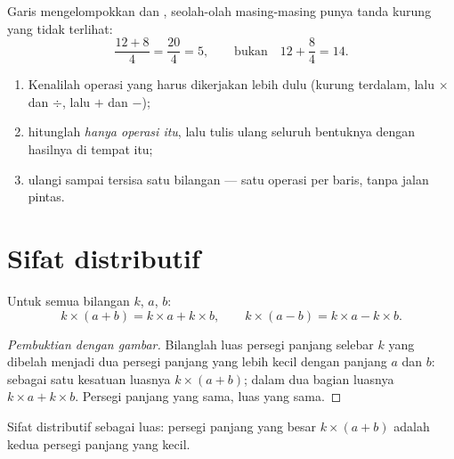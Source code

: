 \begin{remark}
Garis  mengelompokkan  dan , seolah-olah
masing-masing punya tanda kurung yang tidak terlihat:
\[
\frac{12 + 8}{4} = \frac{20}{4} = 5,
\qquad\text{bukan}\quad 12 + \frac{8}{4} = 14 .
\]
\end{remark}

\begin{method}\label{met:g7:priorities:safe}
\begin{enumerate}
  \item Kenalilah operasi yang harus dikerjakan lebih dulu (kurung
        terdalam, lalu $\times$ dan $\div$, lalu $+$ dan $-$);
  \item hitunglah \emph{hanya operasi itu}, lalu tulis ulang seluruh
        bentuknya dengan hasilnya di tempat itu;
  \item ulangi sampai tersisa satu bilangan --- satu operasi per
        baris, tanpa jalan pintas.
\end{enumerate}
\end{method}

\section{Sifat distributif}

\begin{theorem}\label{thm:g7:priorities:distributivity}
Untuk semua bilangan $k$, $a$, $b$:
\[
k \times (a + b) = k \times a + k \times b,
\qquad
k \times (a - b) = k \times a - k \times b .
\]
\end{theorem}

\begin{proof}[Pembuktian dengan gambar]
Bilanglah luas persegi panjang selebar $k$ yang dibelah menjadi dua
persegi panjang yang lebih kecil dengan panjang $a$ dan $b$: sebagai
satu kesatuan luasnya $k \times (a+b)$; dalam dua bagian luasnya
$k \times a + k \times b$. Persegi panjang yang sama, luas yang sama.
\end{proof}

\begin{omfigure}

{\small Sifat distributif sebagai luas: persegi panjang yang besar
$k \times (a + b)$ adalah  kedua persegi panjang yang kecil.}
\end{omfigure}

